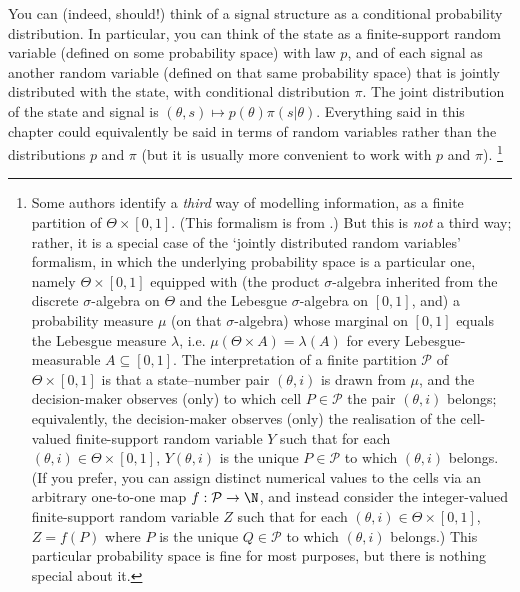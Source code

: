 \begin{remark}
	\label{remark:rv_embedding}
	You can (indeed, should!) think of a signal structure as a conditional probability distribution. In particular, you can think of the state as a finite-support random variable (defined on some probability space) with law $p$, and of each signal as another random variable (defined on that same probability space) that is jointly distributed with the state, with conditional distribution $\pi$. The joint distribution of the state and signal is $(\theta,s) \mapsto p(\theta) \pi(s|\theta)$. Everything said in this chapter could equivalently be said in terms of random variables rather than the distributions $p$ and $\pi$ (but it is usually more convenient to work with $p$ and $\pi$).%
		\footnote{Some authors identify a \emph{third} way of modelling information, as a finite partition of $\Theta \times [0,1]$. (This formalism is from \textcite{GreenStokey1978}.) But this is \emph{not} a third way; rather, it is a special case of the `jointly distributed random variables' formalism, in which the underlying probability space is a particular one, namely $\Theta \times [0,1]$ equipped with (the product $\sigma$-algebra inherited from the discrete $\sigma$-algebra on $\Theta$ and the Lebesgue $\sigma$-algebra on $[0,1]$, and) a probability measure $\mu$ (on that $\sigma$-algebra) whose marginal on $[0,1]$ equals the Lebesgue measure $\lambda$, i.e. $\mu(\Theta \times A) = \lambda(A)$ for every Lebesgue-measurable $A \subseteq [0,1]$. The interpretation of a finite partition $\mathcal{P}$ of $\Theta \times [0,1]$ is that a state--number pair $(\theta,i)$ is drawn from $\mu$, and the decision-maker observes (only) to which cell $P \in \mathcal{P}$ the pair $(\theta,i)$ belongs; equivalently, the decision-maker observes (only) the realisation of the cell-valued finite-support random variable $Y$ such that for each $(\theta,i) \in \Theta \times [0,1]$, $Y(\theta,i)$ is the unique $P \in \mathcal{P}$ to which $(\theta,i)$ belongs. (If you prefer, you can assign distinct numerical values to the cells via an arbitrary one-to-one map $f : \mathcal{P} \to \N$, and instead consider the integer-valued finite-support random variable $Z$ such that for each $(\theta,i) \in \Theta \times [0,1]$, $Z=f(P)$ where $P$ is the unique $Q \in \mathcal{P}$ to which $(\theta,i)$ belongs.) This particular probability space is fine for most purposes, but there is nothing special about it.}
\end{remark}

